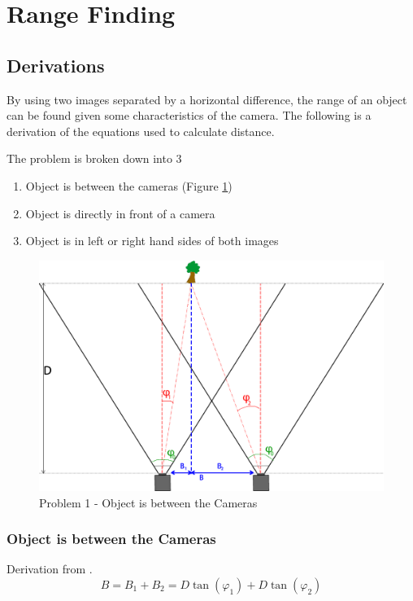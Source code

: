 \section{Range Finding}

\subsection{Derivations}

By using two images separated by a horizontal difference, the range of an object can be found given some characteristics of the camera. The following is a derivation of the equations used to calculate distance. 

The problem is broken down into 3
\begin{enumerate}
\item Object is between the cameras (Figure \ref{problem_between})
\item Object is directly in front of a camera
\item Object is in left or right hand sides of both images
\end{enumerate}

\begin{figure}
\includegraphics[width=\textwidth,height=\textheight,keepaspectratio]{Figures/problem1.png}
\caption{Problem 1 - Object is between the Cameras}
\label{problem_between}
\end{figure}

\subsubsection{Object is between the Cameras}
Derivation from \cite{Mrovlje:Distance_Stereoscopic}.
\begin{equation} \label{eq:B}
B = B_{1} + B_{2} = D\tan(\varphi_{1}) + D\tan(\varphi_{2})
\end{equation}

